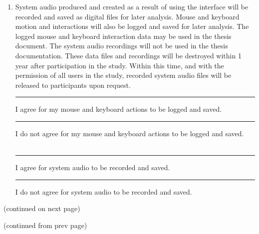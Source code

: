 \documentclass[10pt]{article}
\begin{document}
\begin{enumerate}
\item System audio produced and created as a result of using the interface will 
  be recorded and saved as digital files for later analysis. Mouse and keyboard
  motion and interactions will also be logged and saved for later analysis.
  The logged mouse and keyboard interaction data may be used in the thesis document.
  The system audio recordings will not be used in the thesis documentation. These
  data files and recordings will be destroyed within 1 year after participation
  in the study. Within this time, and with the permission of all users in the study,
  recorded system audio files will be released to participants upon request.\\
  \noindent
\hspace*{0.3in} \rule{0.3in}{1pt} I agree for my mouse and keyboard actions to be logged and saved. \\
\hspace*{0.3in} \rule{0.3in}{1pt} I do not agree for my mouse and keyboard actions to be logged and saved.\\
\\
\hspace*{0.3in} \rule{0.3in}{1pt} I agree for system audio to be recorded and saved. \\
\hspace*{0.3in} \rule{0.3in}{1pt} I do not agree for system audio to be recorded and saved.\\

\end{enumerate}

\vspace{0.3in}

\begin{center}(continued on next page)\end{center}

\newpage

\begin{center}(continued from prev page)\end{center}

\vspace{0.3in}
\end{document}
